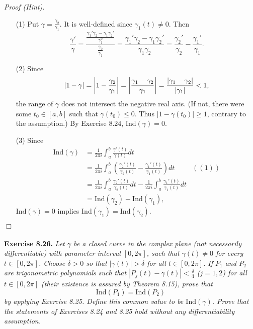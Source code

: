\documentclass{article}
\begin{document}
\emph{Proof (Hint).}
\begin{enumerate}
\item[(1)]
  Put $\gamma = \frac{\gamma_2}{\gamma_1}$.
  It is well-defined since $\gamma_1(t) \neq 0$.
  Then
  \[
    \frac{\gamma'}{\gamma}
    = \frac{\frac{\gamma_1'\gamma_2-\gamma_1\gamma_2'}{\gamma_1^2}}{\frac{\gamma_2}{\gamma_1}}
    = \frac{\gamma_1'\gamma_2-\gamma_1\gamma_2'}{\gamma_1\gamma_2}
    = \frac{\gamma_2'}{\gamma_2} - \frac{\gamma_1'}{\gamma_1}.
  \]

\item[(2)]
Since
\[
  |1-\gamma|
  = \abs{ 1 - \frac{\gamma_2}{\gamma_1} }
  = \abs{ \frac{\gamma_1 - \gamma_2}{\gamma_1} }
  = \frac{|\gamma_1 - \gamma_2|}{|\gamma_1|}
  < 1,
\]
the range of $\gamma$ does not intersect the negative real axis.
(If not, there were some $t_0 \in [a,b]$ such that $\gamma(t_0) \leq 0$.
Thus $|1-\gamma(t_0)| \geq 1$, contrary to the assumption.)
By Exercise 8.24, $\mathrm{Ind}(\gamma) = 0$.

\item[(3)]
Since
\begin{align*}
  \mathrm{Ind}(\gamma)
  &= \frac{1}{2\pi i}\int_{a}^{b} \frac{\gamma'(t)}{\gamma(t)} dt \\
  &= \frac{1}{2\pi i}\int_{a}^{b}
      \left( \frac{\gamma_2'(t)}{\gamma_2(t)} - \frac{\gamma_1'(t)}{\gamma_1(t)} \right) dt
    &((1)) \\
  &= \frac{1}{2\pi i}\int_{a}^{b} \frac{\gamma_2'(t)}{\gamma_2(t)} dt
    - \frac{1}{2\pi i}\int_{a}^{b} \frac{\gamma_1'(t)}{\gamma_1(t)} dt \\
  &= \mathrm{Ind}(\gamma_2) - \mathrm{Ind}(\gamma_1),
\end{align*}
$\mathrm{Ind}(\gamma) = 0$ implies
$\mathrm{Ind}(\gamma_1) = \mathrm{Ind}(\gamma_2)$.
\end{enumerate}
$\Box$ \\\\






\textbf{Exercise 8.26.}
\emph{Let $\gamma$ be a closed curve in the complex plane (not necessarily differentiable)
with parameter interval $[0,2\pi]$, such that $\gamma(t) \neq 0$ for every $t \in [0,2\pi]$.
Choose $\delta > 0$ so that $|\gamma(t)| > \delta$ for all $t \in [0,2\pi]$.
If $P_1$ and $P_2$ are trigonometric polynomials such that
$|P_j(t)-\gamma(t)| < \frac{\delta}{4}$ ($j = 1, 2$)
for all $t \in [0,2\pi]$ (their existence is assured by Theorem 8.15), prove that
\[
  \mathrm{Ind}(P_1) = \mathrm{Ind}(P_2)
\]
by applying Exercise 8.25.
Define this common value to be $\mathrm{Ind}(\gamma)$.
Prove that the statements of Exercises 8.24 and 8.25 hold without any
differentiability assumption.} \\
\end{document}
